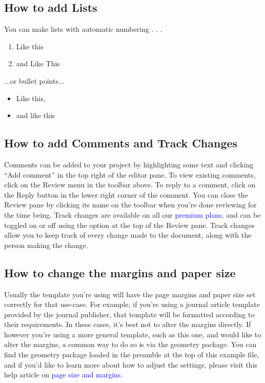 \documentclass{article}
\begin{document}
	\subsection{How to add Lists}
	You can make lists with automatic numbering . . .
		\begin{enumerate}
			\item Like this
			\item and Like This
		\end{enumerate}
	...or bullet points...
		\begin{itemize}
			\item Like this,
			\item and like this
		\end{itemize}
	\subsection{How to add Comments and Track Changes}
	Comments can be added to your project by highlighting some text and clicking “Add comment” in
	the top right of the editor pane. To view existing comments, click on the Review menu in the toolbar
	above. To reply to a comment, click on the Reply button in the lower right corner of the comment.
	You can close the Review pane by clicking its name on the toolbar when you’re done reviewing for the
	time being.
	Track changes are available on all our \textcolor{blue}{premium plans}, and can be toggled on or off using the option
	at the top of the Review pane. Track changes allow you to keep track of every change made to the
	document, along with the person making the change.
	
	\subsection{How to change the margins and paper size}
	Usually the template you’re using will have the page margins and paper size set correctly for that
	use-case. For example, if you’re using a journal article template provided by the journal publisher,
	that template will be formatted according to their requirements. In these cases, it’s best not to alter
	the margins directly.
	If however you’re using a more general template, such as this one, and would like to alter the
	margins, a common way to do so is via the geometry package. You can find the geometry package
	loaded in the preamble at the top of this example file, and if you’d like to learn more about how to
	adjust the settings, please visit this help article on \textcolor{blue}{page size and margins}.
	
\end{document}
